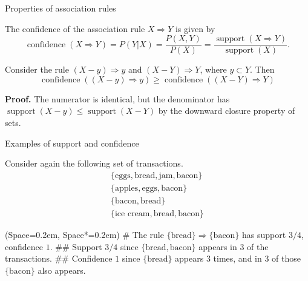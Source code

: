 \documentclass[12pt, aspectratio=1610]{beamer}
\newcommand{\listSpace}{0.2em}
\theoremstyle{plain}
\begin{document}
\begin{frame}[fragile]{Properties of association rules}
	
	\begin{definition}[Confidence]
		The confidence of the association rule $X \Rightarrow Y$ is given by 
		\begin{equation*}
		\operatorname{confidence}(X \Rightarrow Y) = P(Y | X) = \frac{P(X, Y) }{P(X) } = \frac{\operatorname{support}(X \Rightarrow Y)}{\operatorname{support}(X)}.
		\end{equation*}
	\end{definition}

	
	\begin{theorem}
		Consider the rule $(X - y) \Rightarrow y$ and $(X - Y) \Rightarrow Y$, where $y \subset Y$. Then
		\begin{equation*}
			\operatorname{confidence} \left( (X - y) \Rightarrow y \right) \geq
			\operatorname{confidence} \left( (X - Y) \Rightarrow Y \right)
		\end{equation*}
	\end{theorem}
	\textbf{Proof.} The numerator is identical, but the denominator has
	$\operatorname{support}(X - y) \leq \operatorname{support}(X - Y)$
	by the downward closure property of sets.
	
\end{frame}



\begin{frame}[fragile]{Examples of support and confidence}
	
	\begin{example}
		Consider again the following set of transactions.
		\begin{align*}
		\{ \text{eggs}, \text{bread}, \text{jam}, \text{bacon} \} \\ 
		\{ \text{apples} , \text{eggs}, \text{bacon} \} \\
		\{ \text{bacon} , \text{bread} \} \\
		\{ \text{ice cream} , \text{bread}, \text{bacon} \}
		\end{align*}
		\vspace{-2em}
		\begin{easylist}[itemize]
			\ListProperties(Space=\listSpace, Space*=\listSpace)
			# The rule $\{ \text{bread} \} \Rightarrow \{ \text{bacon} \}$ has support $3/4$,  confidence $1$.
			## Support $3/4$ since $\{ \text{bread},  \text{bacon}\}$ appears in $3$ of the transactions.
			## Confidence $1$ since $\{ \text{bread} \}$ appears 3 times, and in 3 of those $\{ \text{bacon} \}$ also appears.
		\end{easylist}
		
	\end{example}
\end{frame}
\end{document}

